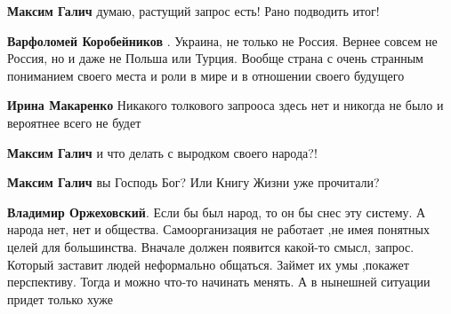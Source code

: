 \begin{itemize}
\begin{itemize}
\textbf{Максим Галич} думаю, растущий запрос есть!
Рано подводить итог!

 
\textbf{Варфоломей Коробейников} . Украина, не только не Россия. Вернее совсем не Россия, но и даже не Польша или Турция. Вообще страна с очень странным пониманием своего места и роли в мире и в отношении своего будущего

 
\textbf{Ирина Макаренко} Никакого толкового запрооса здесь нет и никогда не было и вероятнее всего не будет

 
\textbf{Максим Галич} и что делать с выродком своего народа?!

 
\textbf{Максим Галич} вы Господь Бог? Или
Книгу Жизни уже прочитали?

 
\textbf{Владимир Оржеховский}. Если бы был народ, то он бы снес эту систему. А народа нет, нет и общества. Самоорганизация не работает ,не имея понятных целей для большинства. Вначале должен появится какой-то смысл, запрос. Который заставит людей неформально общаться. Займет их умы ,покажет перспективу. Тогда и можно что-то начинать менять. А в нынешней ситуации придет только хуже


\end{itemize}
\end{itemize}
